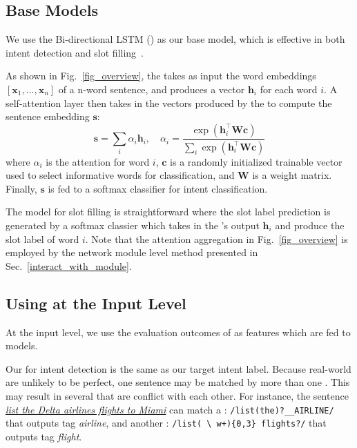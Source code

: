 \subsection{Base Models}
\label{sec:baseline}
We use the Bi-directional LSTM (\BLSTM) as our base \NN model, which is effective in both intent detection and slot
filling~\cite{liu2016attention}.

 As shown in Fig.~\ref{fig_overview}, the \BLSTM takes as input the word embeddings $[\textbf{x}_1, ...,
\textbf{x}_n]$ of a n-word sentence, and produces a vector $\textbf{h}_i$ for each word $i$. A self-attention layer then takes in the
vectors produced by the \BLSTM to compute the sentence embedding $\textbf{s}$:
\begin{equation}
\textbf{s} = \sum_{i}{\alpha_i\textbf{h}_i}, \quad \alpha_i=\frac{\exp(\textbf{h}_i^\intercal \textbf{Wc})}{\sum_{i}{\exp(\textbf{h}_i^\intercal \textbf{Wc})}}
\label{eq:simple_att}
\end{equation}
where  $\alpha_i$ is the attention for word $i$, $\textbf{c}$ is a randomly initialized trainable vector used to select informative words for classification, and $\textbf{W}$ is a weight matrix.
Finally, $\textbf{s}$ is fed to a softmax classifier for intent classification.

 The model for slot filling is  straightforward where the slot label prediction is generated by a softmax
classier which takes in the \BLSTM's output $\textbf{h}_i$ and produce the slot label of word $i$. Note that the attention
aggregation in Fig.~\ref{fig_overview} is employed by the network module level method presented in Sec.~\ref{interact_with_module}.


\subsection{Using \REs at the Input Level}
\label{fusion_with_input}
At the input level, we use the evaluation outcomes of \REs as features which are fed to \NN models.

Our \REtag for intent detection is the same as our target intent label.
Because real-world \REs are unlikely to be perfect, one sentence may be matched by more than one \RE. This may result in several \REtags
that are conflict with each other. For instance, the sentence \textsl{\underline{list the Delta airlines flights to Miami}} can match a
\RE: {\small \texttt{/list(\;the)?\;\_\_AIRLINE/}} that outputs tag \emph{airline}, and another \RE: {\small \texttt{/list(\,\textbackslash
w+)\{0,3\} flights?/}} that outputs tag \emph{flight}.

